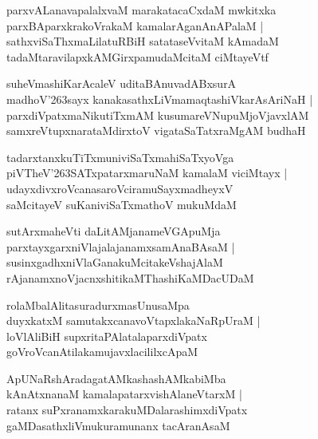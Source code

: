 \documentclass[twoside,12pt,openright]{book}
\def\S{\char'263}
\newcounter{shloka}[chapter]
\begin{document}
\begin{shloka}%
parxvALanavapalalxvaM marakatacaCxdaM mwkitxka \\
parxBAparxkrakoVrakaM kamalarAganAnAPalaM |\\
sathxviSaThxmaLilatuRBiH satataseVvitaM kAmadaM \\
tadaMtaravilapxkAMGirxpamudaMcitaM ciMtayeVtf
\end{shloka}

\begin{shloka}%
suheVmashiKarAcaleV uditaBAnuvadABxsurA \\
madhoV\S sayx kanakasathxLiVmamaqtashiVkarAsAriNaH |\\
parxdiVpatxmaNikutiTxmAM kusumareVNupuMjoVjavxlAM \\
samxreVtupxnarataMdirxtoV vigataSaTatxraMgAM budhaH 
\end{shloka}

\begin{shloka}%
tadarxtanxkuTiTxmuniviSaTxmahiSaTxyoVga \\
piVTheV\S SATxpatarxmaruNaM kamalaM viciMtayx |\\
udayxdivxroVcanasaroVciramuSayxmadheyxV \\
saMcitayeV suKaniviSaTxmathoV mukuMdaM 
\end{shloka}

\begin{shloka}%
sutArxmaheVti daLitAMjanameVGApuMja \\
parxtayxgarxniVlajalajanamxsamAnaBAsaM |\\
susinxgadhxniVlaGanakuMcitakeVshajAlaM \\
rAjanamxnoVjacnxshitikaMThashiKaMDacUDaM 
\end{shloka}

\begin{shloka}%
rolaMbalAlitasuradurxmasUnusaMpa \\
duyxkatxM samutakxcanavoVtapxlakaNaRpUraM |\\
loVlAliBiH supxritaPAlatalaparxdiVpatx\\
goVroVcanAtilakamujavxlacililxcApaM 
\end{shloka}

\begin{shloka}%
ApUNaRshAradagatAMkashashAMkabiMba \\
kAnAtxnanaM kamalapatarxvishAlaneVtarxM |\\
ratanx suPxranamxkarakuMDalarashimxdiVpatx\\
gaMDasathxliVmukuramunanx tacAranAsaM 
\end{shloka}
\end{document}
